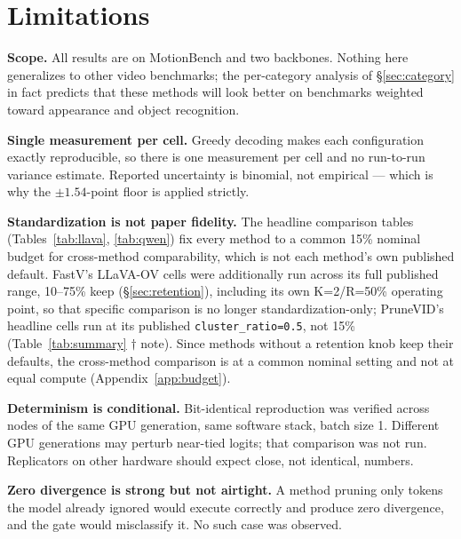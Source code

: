 \documentclass[11pt]{article}
\begin{document}
\section{Limitations}
\label{app:limits}

\textbf{Scope.} All results are on MotionBench and two backbones. Nothing
here generalizes to other video benchmarks; the per-category analysis of
\S\ref{sec:category} in fact predicts that these methods will look better on
benchmarks weighted toward appearance and object recognition.

\textbf{Single measurement per cell.} Greedy decoding makes each
configuration exactly reproducible, so there is one measurement per cell and
no run-to-run variance estimate. Reported uncertainty is binomial, not
empirical --- which is why the $\pm1.54$-point floor is applied strictly.

\textbf{Standardization is not paper fidelity.} The headline comparison
tables (Tables~\ref{tab:llava}, \ref{tab:qwen}) fix every method to a common
15\% nominal budget for cross-method comparability, which is not each
method's own published default. FastV's LLaVA-OV cells were additionally
run across its full published range, 10--75\% keep (\S\ref{sec:retention}),
including its own K=2/R=50\% operating point, so that specific comparison is
no longer standardization-only; PruneVID's headline cells run at its
published \texttt{cluster\_ratio=0.5}, not 15\% (Table~\ref{tab:summary}
$\dagger$ note). Since methods without a retention knob keep their defaults,
the cross-method comparison is at a common nominal setting and not at equal
compute (Appendix~\ref{app:budget}).

\textbf{Determinism is conditional.} Bit-identical reproduction was verified
across nodes of the same GPU generation, same software stack, batch size 1.
Different GPU generations may perturb near-tied logits; that comparison was
not run. Replicators on other hardware should expect close, not identical,
numbers.

\textbf{Zero divergence is strong but not airtight.} A method pruning only
tokens the model already ignored would execute correctly and produce zero
divergence, and the gate would misclassify it. No such case was observed.
\end{document}
